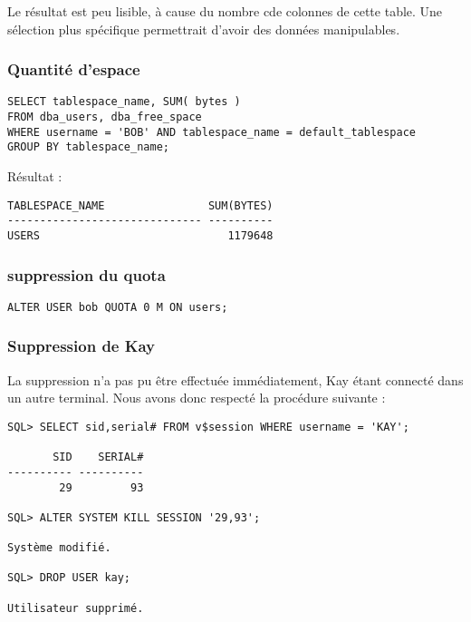 Le résultat est peu lisible, à cause du nombre cde colonnes de cette table.
Une sélection plus spécifique permettrait d’avoir des données manipulables.

\subsubsection{Quantité d’espace}

\begin{verbatim}
SELECT tablespace_name, SUM( bytes )
FROM dba_users, dba_free_space
WHERE username = 'BOB' AND tablespace_name = default_tablespace
GROUP BY tablespace_name;
\end{verbatim}

Résultat :
\begin{verbatim}
TABLESPACE_NAME                SUM(BYTES)                                       
------------------------------ ----------                                       
USERS                             1179648 
\end{verbatim}

\subsubsection{suppression du quota}

\begin{verbatim}
ALTER USER bob QUOTA 0 M ON users;
\end{verbatim}

\subsubsection{Suppression de Kay}

La suppression n’a pas pu être effectuée immédiatement, Kay étant connecté
dans un autre terminal. Nous avons donc respecté la procédure suivante :

\begin{verbatim}
SQL> SELECT sid,serial# FROM v$session WHERE username = 'KAY';

       SID    SERIAL#                                                           
---------- ----------                                                           
        29         93   

SQL> ALTER SYSTEM KILL SESSION '29,93';

Système modifié.

SQL> DROP USER kay;

Utilisateur supprimé.                                                        
\end{verbatim}

